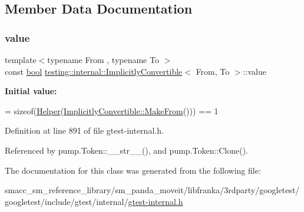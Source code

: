 \subsection{Member Data Documentation}
\mbox{\label{classtesting_1_1internal_1_1ImplicitlyConvertible_aea51cecabca681fb75659e224771b7b7}} 
\subsubsection{\texorpdfstring{value}{value}}
{\footnotesize\ttfamily template$<$typename From , typename To $>$ \\
const \hyperlink{classbool}{bool} \hyperlink{classtesting_1_1internal_1_1ImplicitlyConvertible}{testing\+::internal\+::\+Implicitly\+Convertible}$<$ From, To $>$\+::value\hspace{0.3cm}{\ttfamily [static]}}

{\bfseries Initial value\+:}
\begin{DoxyCode}
=
      \textcolor{keyword}{sizeof}(\hyperlink{classtesting_1_1internal_1_1ImplicitlyConvertible_a20029a4415e5f9ae152b8fce8b124980}{Helper}(\hyperlink{classtesting_1_1internal_1_1ImplicitlyConvertible_adb692b091aebd0cde316c8c2c0ab661f}{ImplicitlyConvertible::MakeFrom}())) == 1
\end{DoxyCode}


Definition at line 891 of file gtest-\/internal.\+h.



Referenced by pump.\+Token\+::\+\_\+\+\_\+str\+\_\+\+\_\+(), and pump.\+Token\+::\+Clone().



The documentation for this class was generated from the following file\+:\begin{DoxyCompactItemize}
\item 
smacc\+\_\+sm\+\_\+reference\+\_\+library/sm\+\_\+panda\+\_\+moveit/libfranka/3rdparty/googletest/googletest/include/gtest/internal/\hyperlink{gtest-internal_8h}{gtest-\/internal.\+h}\end{DoxyCompactItemize}
